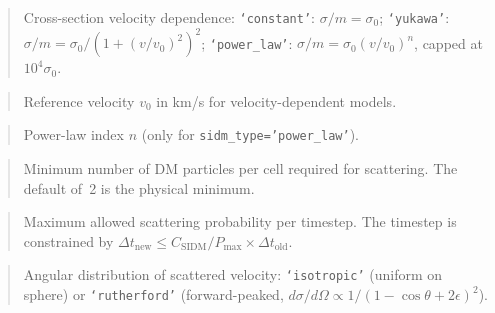 \label{param:sidm_type}

\begin{quote}
Cross-section velocity dependence:
\texttt{`constant'}: $\sigma/m = \sigma_0$;
\texttt{`yukawa'}: $\sigma/m = \sigma_0/(1+(v/v_0)^2)^2$;
\texttt{`power\_law'}: $\sigma/m = \sigma_0(v/v_0)^n$, capped at $10^4\sigma_0$.
\end{quote}

\label{param:sidm_v0}

\begin{quote}
Reference velocity $v_0$ in km/s for velocity-dependent models.
\end{quote}

\label{param:sidm_power}

\begin{quote}
Power-law index $n$ (only for \texttt{sidm\_type='power\_law'}).
\end{quote}

\label{param:sidm_npart_min}

\begin{quote}
Minimum number of DM particles per cell required for scattering.
The default of~2 is the physical minimum.
\end{quote}

\label{param:sidm_courant}

\begin{quote}
Maximum allowed scattering probability per timestep.
The timestep is constrained by
$\Delta t_{\mathrm{new}} \le C_{\mathrm{SIDM}}/P_{\max} \times \Delta t_{\mathrm{old}}$.
\end{quote}

\label{param:sidm_angular}

\begin{quote}
Angular distribution of scattered velocity:
\texttt{`isotropic'} (uniform on sphere) or
\texttt{`rutherford'} (forward-peaked, $d\sigma/d\Omega \propto 1/(1-\cos\theta+2\epsilon)^2$).
\end{quote}

